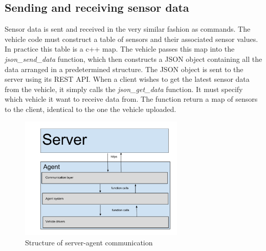 \subsection{Sending and receiving sensor data}
Sensor data is sent and received in the very similar fashion as commands.
The vehicle code must construct a table of sensors and their associated sensor values. 
In practice this table is a c++ map. 
The vehicle passes this map into the \textit{json\_send\_data} function, which then constructs a JSON object containing all the data arranged in a predetermined structure. 
The JSON object is sent to the server using its REST API.
When a client wishes to get the latest sensor data from the vehicle, it simply calls the \textit{json\_get\_data} function. It must specify which vehicle it want to receive data from. The function return a map of sensors to the client, identical to the one the vehicle uploaded.

\begin{figure}[H]
    \centering
    \includegraphics[width=0.7\textwidth]{graphics/Agent_server_communication.png} 
    \caption{Structure of server-agent communication}
    \label{fig:agent_server_communication}
\end{figure}


